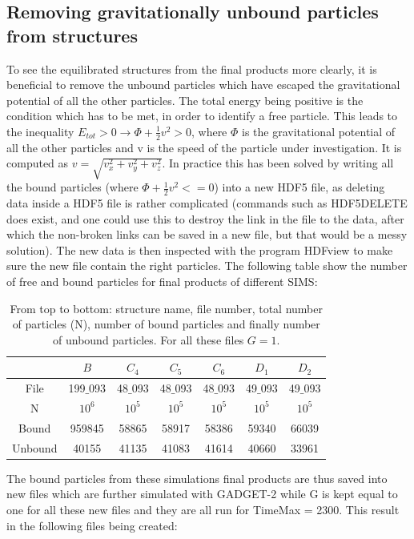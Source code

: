 \subsection{Removing gravitationally unbound particles from structures}
To see the equilibrated structures from the final products more clearly, it is beneficial to remove the unbound particles which have escaped the gravitational potential of all the other particles. The total energy being positive is the condition which has to be met, in order to identify a free particle. This leads to the inequality $E_{tot} > 0 \rightarrow \Phi + \frac{1}{2}v^2 > 0$, where $\Phi$ is the gravitational potential of all the other particles and v is the speed of the particle under investigation. It is computed as $v = \sqrt{v_x^2+v_y^2+v_z^2}$. In practice this has been solved by writing all the bound particles (where $\Phi + \frac{1}{2}v^2 <= 0$) into a new HDF5 file, as deleting data inside a HDF5 file is rather complicated (commands such as HDF5DELETE does exist, and one could use this to destroy the link in the file to the data, after which the non-broken links can be saved in a new file, but that would be a messy solution). The new data is then inspected with the program HDFview to make sure the new file contain the right particles. The following table show the number of free and bound particles for final products of different SIMS:
\begin{table}[h]
\centering
\begin{tabular}{|c|c|c|c|c|c|c|}
\hline
         &     $B$    &    $C_4$  & $C_5$     & $C_6$     &  $D_1$    & $D_2$     \\ \hline
 File    & 199$\_$093 & 48$\_$093 & 48$\_$093 & 48$\_$093 & 49$\_$093 & 49$\_$093 \\ \hline
 N       &   $10^6$   &  $10^5$   & $10^5$    &  $10^5$   & $10^5$    & $10^5$  \\ \hline
 Bound   &   959845   &  58865    & 58917     &  58386    & 59340     & 66039  \\ \hline
 Unbound &   40155    &  41135    & 41083     &  41614    & 40660     & 33961  \\ \hline
\end{tabular}
\caption{From top to bottom: structure name, file number, total number of particles (N), number of bound particles and finally number of unbound particles. For all these files $G=1$.}
\end{table}
The bound particles from these simulations final products are thus saved into new files which are further simulated with GADGET-2 while G is kept equal to one for all these new files and they are all run for TimeMax = 2300. This result in the following files being created:
